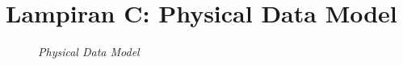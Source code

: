 \chapter{Lampiran C: Physical Data Model} \label{lampiran:pdm}
\begin{figure}[H]
	\caption{\textit{Physical Data Model}}
\end{figure}
